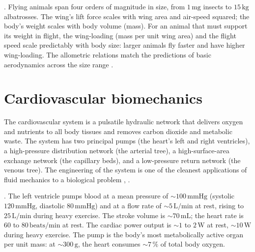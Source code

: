 . Flying animals span four orders of magnitude
in size, from $1\,\text{mg}$ insects to $15\,\text{kg}$ albatrosses.
The wing's lift force scales with wing area and air-speed squared;
the body's weight scales with body volume (mass). For an animal that
must support its weight in flight, the wing-loading (mass per unit
wing area) and the flight speed scale predictably with body size:
larger animals fly faster and have higher wing-loading. The
allometric relations match the predictions of basic aerodynamics
across the size range \cite[ch.~6]{text:fung-biomechanics}.

\section{Cardiovascular biomechanics}

The cardiovascular system is a pulsatile hydraulic network that
delivers oxygen and nutrients to all body tissues and removes carbon
dioxide and metabolic waste. The system has two principal pumps (the
heart's left and right ventricles), a high-pressure distribution
network (the arterial tree), a high-surface-area exchange network
(the capillary beds), and a low-pressure return network (the venous
tree). The engineering of the system is one of the cleanest
applications of fluid mechanics to a biological problem
\cite[ch.~5]{text:fung-biomechanics},
\cite[ch.~3]{text:v6c06-klabunde-cv-2011}.

. The left ventricle pumps blood at a
mean pressure of $\sim 100\,\text{mmHg}$ (systolic $120\,\text{mmHg}$,
diastolic $80\,\text{mmHg}$) and at a flow rate of $\sim 5\,\text{L}/
\text{min}$ at rest, rising to $25\,\text{L}/\text{min}$ during heavy
exercise. The stroke volume is $\sim 70\,\text{mL}$; the heart rate
is $60$ to $80\,\text{beats}/\text{min}$ at rest. The cardiac power
output is $\sim 1$ to $2\,\text{W}$ at rest, $\sim 10\,\text{W}$
during heavy exercise. The pump is the body's most metabolically
active organ per unit mass: at $\sim 300\,\text{g}$, the heart
consumes $\sim 7\,\%$ of total body oxygen.

